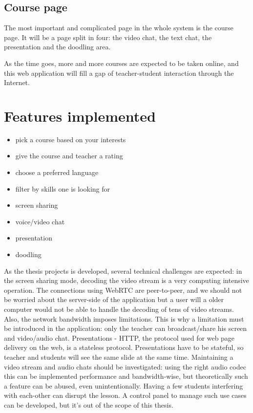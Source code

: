 \subsection{Course page}
The most important and complicated page in the whole system is the course page.
It will be a page split in four: the video chat, the text chat, the presentation
and the doodling area.

As the time goes, more and more courses are expected to be taken online, and
this web application will fill a gap of teacher-student interaction through the
Internet.
\section{Features implemented}
\begin{itemize}
    \item pick a course based on your interests
    \item give the course and teacher a rating
    \item choose a preferred language
    \item filter by skills one is looking for
    \item screen sharing
    \item voice/video chat
    \item presentation
    \item doodling
\end{itemize}

As the thesis projects is developed, several technical challenges are expected:
in the screen sharing mode, decoding the video stream is a very computing
intensive operation. The connections using WebRTC are peer-to-peer, and  we
should not be worried about the server-side of the application but a user will
a older computer would not be able to handle the decoding of tens of video
streams. Also, the network bandwidth imposes limitations. This is why a
limitation must be introduced in the application: only the teacher can
broadcast/share his screen and video/audio chat. Presentations - HTTP, the
protocol used for web page delivery on the web, is a stateless protocol.
Presentations have to be stateful, so teacher and students will see the same
slide at the same time. Maintaining a video stream and audio chats should be
investigated: using the right audio codec this can be implemented performance
and bandwidth-wise, but theoretically such a feature can be abused, even
unintentionally. Having a few students interfering with each-other can disrupt
the lesson. A control panel to manage such use cases can be developed, but it's
out of the scope of this thesis.

